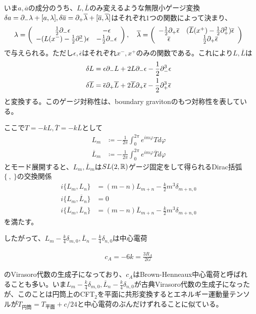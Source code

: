 いま$a,\overline{a}$の成分のうち、$L,\overline{L}$のみ変えるような無限小ゲージ変換$\delta a=\partial_-\lambda+[a,\lambda],\delta \overline{a}=\partial_+\overline{\lambda}+[\overline{a},\overline{\lambda}]$はそれぞれ$1$つの関数によって決まり、
\begin{align}
\lambda=\left(\begin{array}{cc}
\frac{1}{2}\partial_-\epsilon & -\epsilon \\
-(L(x^-)-\frac{1}{2}\partial_-^2)\epsilon & -\frac{1}{2}\partial_-\epsilon \end{array}
\right),\quad
\overline{\lambda}=\left(\begin{array}{cc}
-\frac{1}{2}\partial_+\overline{\epsilon} & (\overline{L}(x^+)-\frac{1}{2}\partial_+^2)\overline{\epsilon} \\
\overline{\epsilon} & \frac{1}{2}\partial_+\overline{\epsilon}
\end{array}
\right)
\end{align}
で与えられる。ただし$\epsilon,\overline{\epsilon}$はそれぞれ$x^-,x^+$のみの関数である。これにより$L,\overline{L}$は
\begin{align}\label{infinitestimaltransfofL}
\delta L&=\epsilon \partial_- L +2L\partial_- \epsilon -\frac{1}{2}\partial_-^3\epsilon\\
\delta \overline{L}&=\overline{\epsilon} \partial_+ \overline{L} +2\overline{L}\partial_+ \overline{\epsilon} -\frac{1}{2}\partial_+^3\overline{\epsilon}
\end{align}
と変換する。このゲージ対称性は、boundary gravitonのもつ対称性を表している。

ここで$T=-kL,\overline{T}=-k\overline{L}$として
\begin{align}
L_m&\coloneqq -\frac{1}{2\pi}\int_{0}^{2\pi} e^{im\varphi}T d\varphi\\
\overline{L}_m&\coloneqq -\frac{1}{2\pi}\int_{0}^{2\pi} e^{im\varphi}\overline{T} d\varphi
\end{align}
とモード展開すると、$L_m,\overline{L}_m$は$SL(2,\mathbb{R})$ゲージ固定をして得られるDirac括弧$\{\ ,\ \}$の交換関係
\begin{align}
i\{L_m,L_n\}&=(m-n)L_{m+n}-\frac{k}{2}m^3\delta_{m+n,0}\\
i\{L_m,\overline{L}_n\}&=0\\
i\{\overline{L}_m,\overline{L}_n\}&=(m-n)\overline{L}_{m+n}-\frac{k}{2}m^3\delta_{m+n,0}
\end{align}
を満たす。


したがって、$L_m-\frac{k}{4}\delta_{m,0},\overline{L}_n-\frac{k}{4}\delta_{n,0}$は中心電荷
\begin{oframed}
\begin{align}
c_A=-6k=\frac{3R_A}{2G}
\end{align}
\end{oframed}
のVirasoro代数の生成子になっており、$c_A$はBrown-Henneaux中心電荷\cite{Brown:1986nw}と呼ばれることも多い。いま$L_m-\frac{k}{4}\delta_{m,0},\overline{L}_n-\frac{k}{4}\delta_{n,0}$が古典Virasoro代数の生成子になったが、このことは円筒上のCFT$_2$を平面に共形変換するとエネルギー運動量テンソルが$T_\text{円筒}=T_\text{平面}+c/24$と中心電荷のぶんだけずれることに似ている。

